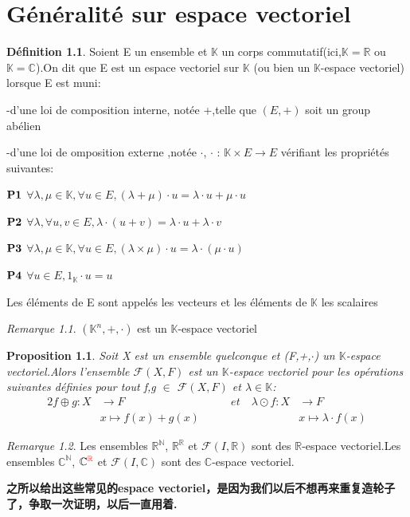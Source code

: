 \documentclass[12pt]{book}
\theoremstyle{definition}\newtheorem{dfn}{Définition}[chapter]
\theoremstyle{plain}\newtheorem{thm}{Théorème}[chapter]
\theoremstyle{plain}\newtheorem{prp}{Proposition}[chapter]
\theoremstyle{plain}\newtheorem{lem}{\bf Lemme}[chapter]
\theoremstyle{plain}\newtheorem{axm}{\bf Axiome}[chapter]
\theoremstyle{plain}\newtheorem{lmm}{\bf Lemme}[chapter]
\theoremstyle{plain}\newtheorem{cor}{\bf Corollaire}[chapter]
\theoremstyle{remark}\newtheorem{rem}{Remarque}[chapter]
\begin{document}
\chapter{Généralité sur espace vectoriel}
\begin{dfn}
        Soient E un ensemble et $\mathbb{K}$ un corps commutatif(ici,$\mathbb{K}=\mathbb{R}$ ou $\mathbb{K}=\mathbb{C}$).On dit que E est un espace vectoriel sur $\mathbb{K}$
(ou bien un $\mathbb{K}$-espace vectoriel)
lorsque E est muni:

-d'une loi de composition interne, notée +,telle que $(E,+)$ soit un group abélien

-d'une loi de omposition externe ,notée $\cdot$, $\cdot$ : $\mathbb{K}\times E \rightarrow E$ vérifiant les propriétés suivantes:

$\bf P1$ $\forall \lambda,\mu \in \mathbb{K},\forall u\in E ,(\lambda+\mu)\cdot u=\lambda\cdot u+\mu\cdot u$

$\bf P2$ $\forall \lambda,\forall u,v\in E ,\lambda\cdot(u+v)=\lambda\cdot u+\lambda\cdot v$


$\bf P3$ $\forall \lambda,\mu \in \mathbb{K},\forall u\in E ,(\lambda\times\mu)\cdot u=\lambda\cdot(\mu\cdot u)$

$\bf P4$ $\forall u\in E ,1_{\mathbb{K}}\cdot u=u$

Les éléments de E sont appelés les vecteurs et les éléments de $\mathbb{K}$ les scalaires
\end{dfn}
\begin{rem}
$(\mathbb{K}^n,+,\cdot)$ est un $\mathbb{K}$-espace vectoriel
\end{rem}
\begin{prp}
        Soit X est un ensemble {\color{red}quelconque} et (F,+,$\cdot$) un $\mathbb{K}$-espace vectoriel.Alors l'ensemble $\mathcal{F}(X,F)$ est un $\mathbb{K}$-espace vectoriel pour les opérations suivantes définies pour tout f,g $\in$ $\mathcal{F}(X,F)$ et $\lambda\in \mathbb{K}$:
\begin{alignat*}{2}
        f\oplus g: X&\rightarrow F&\qquad et \quad \lambda\odot f: X&\rightarrow F\\&x\mapsto f(x)+g(x)
&\quad &x\mapsto \lambda\cdot f(x)
        \end{alignat*}
\end{prp}
\begin{rem}
        Les ensembles $\mathbb{R}^{\mathbb{N}}$,
$\mathbb{R}^{\mathbb{R}}$ et $\mathcal{F}(I,\mathbb{R})$ sont des $\mathbb{R}$-espace vectoriel.Les ensembles $\mathbb{C}^{\mathbb{N}}$,
$\mathbb{C}^{\color{red}\mathbb{R}}$ et $\mathcal{F}(I,\mathbb{C})$ sont des $\mathbb{C}$-espace vectoriel.
\end{rem}
\textbf{之所以给出这些常见的espace vectoriel，是因为我们以后不想再来重复造轮子了，争取一次证明，以后一直用着.}
\end{document}
